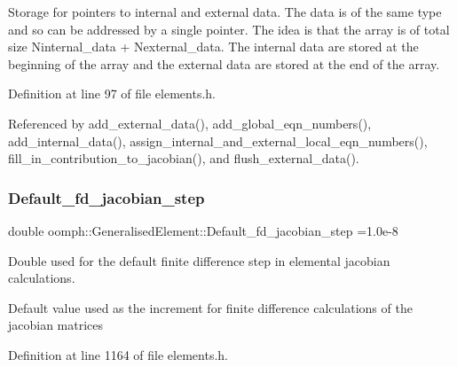 Storage for pointers to internal and external data. The data is of the same type and so can be addressed by a single pointer. The idea is that the array is of total size Ninternal\+\_\+data + Nexternal\+\_\+data. The internal data are stored at the beginning of the array and the external data are stored at the end of the array. 



Definition at line 97 of file elements.\+h.



Referenced by add\+\_\+external\+\_\+data(), add\+\_\+global\+\_\+eqn\+\_\+numbers(), add\+\_\+internal\+\_\+data(), assign\+\_\+internal\+\_\+and\+\_\+external\+\_\+local\+\_\+eqn\+\_\+numbers(), fill\+\_\+in\+\_\+contribution\+\_\+to\+\_\+jacobian(), and flush\+\_\+external\+\_\+data().

\mbox{\label{classoomph_1_1GeneralisedElement_a156163c9f6fbd17548a9fa836616d19b}} 
\subsubsection{\texorpdfstring{Default\+\_\+fd\+\_\+jacobian\+\_\+step}{Default\_fd\_jacobian\_step}}
{\footnotesize\ttfamily double oomph\+::\+Generalised\+Element\+::\+Default\+\_\+fd\+\_\+jacobian\+\_\+step =1.\+0e-\/8\hspace{0.3cm}{\ttfamily [static]}}



Double used for the default finite difference step in elemental jacobian calculations. 

Default value used as the increment for finite difference calculations of the jacobian matrices 

Definition at line 1164 of file elements.\+h.



